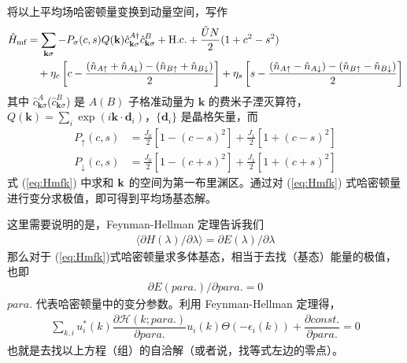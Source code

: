 将以上平均场哈密顿量变换到动量空间，写作
\begin{align}\label{eq:Hmfk}
    \hat{H}_{\text{mf}} &= \sum_{\mathbf{k}\sigma}-P_{\sigma}(c,s)Q(\mathbf{k})\hat{c}_{\mathbf{k}\sigma}^{A\dagger}\hat{c}_{\mathbf{k}\sigma}^B+ \text{H.c.} 
        + \frac{\tilde{U}N}{2}(1+c^2-s^2) \notag\\
        & \  \  \ 
        + \eta_c \left[c-\frac{(\hat{n}_{A\uparrow}+\hat{n}_{A\downarrow}) - (\hat{n}_{B\uparrow}+\hat{n}_{B\downarrow})}{2}\right]
        + \eta_s \left[s-\frac{(\hat{n}_{A\uparrow}-\hat{n}_{A\downarrow}) - (\hat{n}_{B\uparrow}-\hat{n}_{B\downarrow})}{2}\right]
\end{align}
其中 $\hat{c}_{\mathbf{k}\sigma}^A$($\hat{c}_{\mathbf{k}\sigma}^B$) 是 $A(B)$ 子格准动量为 $\mathbf{k}$ 的费米子湮灭算符，$Q(\mathbf{k}) = \sum_{i}\exp(i\mathbf{k}\cdot\mathbf{d}_i)$，$\{\mathbf{d}_i\}$ 是晶格矢量，而
\begin{align}
    P_{\uparrow}(c,s) &= \frac{J_0}{2}\left[1-(c-s)^2\right] + \frac{J_1}{2}\left[1+(c-s)^2\right] \\
    P_{\downarrow}(c,s) &= \frac{J_0}{2}\left[1-(c+s)^2\right] + \frac{J_1}{2}\left[1+(c+s)^2\right] 
\end{align} 
式 (\ref{eq:Hmfk}) 中求和 $\mathbf{k}$ 的空间为第一布里渊区。通过对 (\ref{eq:Hmfk}) 式哈密顿量进行变分求极值，即可得到平均场基态解。

这里需要说明的是，Feynman-Hellman 定理告诉我们
\begin{align}
\langle\partial H(\lambda)/\partial \lambda\rangle=\partial E(\lambda)/\partial \lambda
\end{align}
那么对于 (\ref{eq:Hmfk})式哈密顿量求多体基态，相当于去找（基态）能量的极值，也即
\begin{align}
\partial E(para.)/\partial para. =0
\end{align}
$para.$ 代表哈密顿量中的变分参数。利用 Feynman-Hellman 定理得，
\begin{align}\label{eq:selfconsist}
    \sum_{k,i} u^*_i(k)\dfrac{\partial\mathcal{H}(k;para.)}{\partial para.}u_i(k)\Theta(-\epsilon_i(k))+\dfrac{\partial const.}{\partial para.}=0 
\end{align} 
也就是去找以上方程（组）的自洽解（或者说，找等式左边的零点）。

